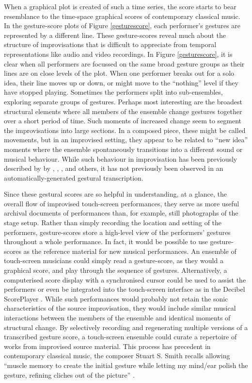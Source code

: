 \documentclass[graybox]{svmult}
\begin{document}
When a graphical plot is created of such a time series, the score
starts to bear resemblance to the time-space graphical scores of
contemporary classical music. In the gesture-score plots of Figure
\ref{gesturescore}, each performer's gestures are represented by a
different line. These gesture-scores reveal much about the
structure of improvisations that is difficult to appreciate from
temporal representations like audio and video recordings. In Figure
\ref{gesturescore}, it is clear when all performers are focussed on
the same broad gesture groups as their lines are on close levels of
the plot. When one performer breaks out for a solo idea, their line
moves up or down, or might move to the ``nothing'' level if they 
have stopped playing. Sometimes the performers split into
sub-ensembles, exploring separate groups of gestures. Perhaps most
interesting are the broadest structural elements where all members of
the ensemble change gestures together over a short period of time.
Such moments of increased change seem to segment the improvisations
into large sections. In a composed piece, these might be called
movements, but in an improvised setting, they appear to be related to
``new idea'' moments where the ensemble spontaneously transitions into
a different sound or musical behaviour. While such behaviour in
improvisation has been previously described by by
\citet{Pressing:1988uo}, \citet{Stenstrom:2009xy},
\citet{Bailey:1993zl}, and others, it has not previously been
observed in an automatically-generated gestural transcription.

Since these gestural scores are so helpful in understanding, at a
glance, the overall flow of improvised touch-screen performances, they
serve as more useful archival documents of performances than, for
example, still photographs of the stage setup. Rather than simply
recording the location and setting of the performers, gesture-scores
store a high-level view of the performers' gestures throughout a whole
performance. In fact, it would be possible to use gesture-scores as
the reference material for new musical performances. An ensemble of
touch-screen musicians could simply read a gesture-score, as they
would a graphical score, and play through the sequence of gestures.
Alternatively, a computerised score display with a synchronised cursor
could be used to assist the performers or even be integrated into the
touch-screen interface as in the Decibel
ScorePlayer \citep{Hope:2015lr}. While such performances would probably
not retain the sonic characteristics of the source improvisation, they
would include similar musical interactions between the members of the
ensemble and identical moments of structural change. By selectively
recording and regenerating multiple versions of a transcribed gesture
score, a touch-screen ensemble could curate a repertoire of works from
improvised source material. This process has precedent in contemporary
classical music, the composer Stuart S. Smith recalls allowing
``muscle memory to create the initial gesture while letting my
mind/ear polish the gesture, refining cliches out of the
picture'' \citep{Smith:1998ff}.
\end{document}
